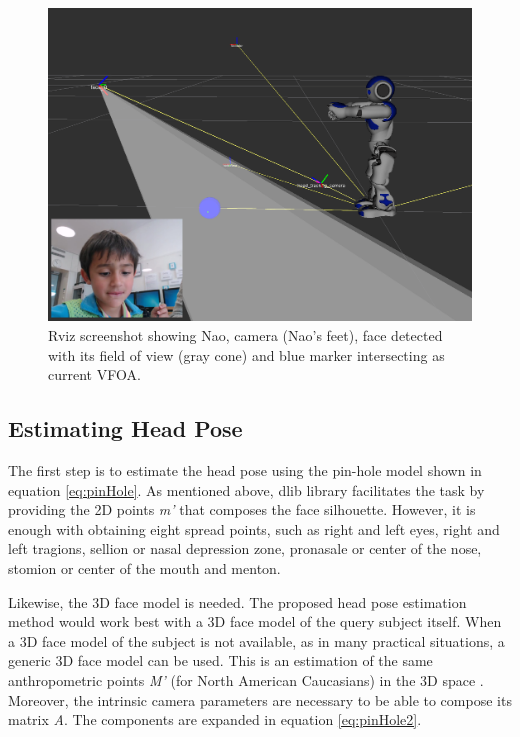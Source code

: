 \documentclass{sig-alternate}
\begin{document}
\begin{figure}
    \centering
    \includegraphics[width=0.9\columnwidth]{rviz_camera}
    \caption{\small Rviz screenshot showing Nao, camera (Nao's feet), face detected with its field of view (gray cone) and blue marker intersecting as current VFOA.}
    \label{rviz}
\end{figure}

\subsection{Estimating Head Pose}
The first step is to estimate the head pose using the pin-hole model shown in
equation \ref{eq:pinHole}. As mentioned above, dlib library facilitates the task
by providing the 2D points \textit{m'} that composes the face silhouette.
However, it is enough with obtaining eight spread points, such as right and left
eyes, right and left tragions, sellion or nasal depression zone, pronasale or
center of the nose, stomion or center of the mouth and menton.

Likewise, the 3D face model is needed. The proposed head pose estimation method
would work best with a 3D face model of the query subject itself. When a 3D face
model of the subject is not available, as in many practical situations, a
generic 3D face model can be used. This is an estimation of the same
anthropometric points \textit{M'} (for North American Caucasians) in the 3D
space \cite{farkas1994anthropometry}. Moreover, the intrinsic camera parameters
are necessary to be able to compose its matrix \textit{A}. The components are
expanded in equation \ref{eq:pinHole2}.	
\end{document}
